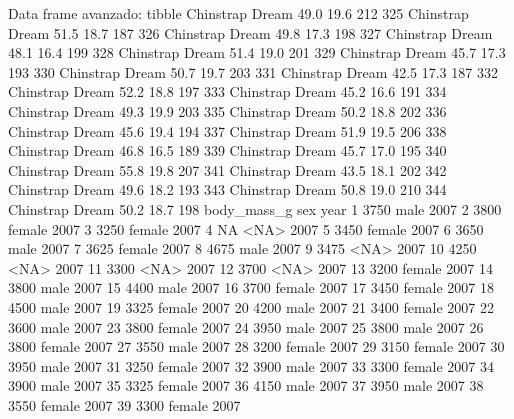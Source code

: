 \documentclass[
  ignorenonframetext,
  aspectratio=169]{beamer}
\let\oldverbatim\verbatim
\let\endoldverbatim\endverbatim
\renewenvironment{verbatim}{\tiny\oldverbatim}{\endoldverbatim}
\begin{document}
\begin{frame}[fragile]{Data frame avanzado: tibble}
\begin{verbatim}
324 Chinstrap     Dream           49.0          19.6               212
325 Chinstrap     Dream           51.5          18.7               187
326 Chinstrap     Dream           49.8          17.3               198
327 Chinstrap     Dream           48.1          16.4               199
328 Chinstrap     Dream           51.4          19.0               201
329 Chinstrap     Dream           45.7          17.3               193
330 Chinstrap     Dream           50.7          19.7               203
331 Chinstrap     Dream           42.5          17.3               187
332 Chinstrap     Dream           52.2          18.8               197
333 Chinstrap     Dream           45.2          16.6               191
334 Chinstrap     Dream           49.3          19.9               203
335 Chinstrap     Dream           50.2          18.8               202
336 Chinstrap     Dream           45.6          19.4               194
337 Chinstrap     Dream           51.9          19.5               206
338 Chinstrap     Dream           46.8          16.5               189
339 Chinstrap     Dream           45.7          17.0               195
340 Chinstrap     Dream           55.8          19.8               207
341 Chinstrap     Dream           43.5          18.1               202
342 Chinstrap     Dream           49.6          18.2               193
343 Chinstrap     Dream           50.8          19.0               210
344 Chinstrap     Dream           50.2          18.7               198
    body_mass_g    sex year
1          3750   male 2007
2          3800 female 2007
3          3250 female 2007
4            NA   <NA> 2007
5          3450 female 2007
6          3650   male 2007
7          3625 female 2007
8          4675   male 2007
9          3475   <NA> 2007
10         4250   <NA> 2007
11         3300   <NA> 2007
12         3700   <NA> 2007
13         3200 female 2007
14         3800   male 2007
15         4400   male 2007
16         3700 female 2007
17         3450 female 2007
18         4500   male 2007
19         3325 female 2007
20         4200   male 2007
21         3400 female 2007
22         3600   male 2007
23         3800 female 2007
24         3950   male 2007
25         3800   male 2007
26         3800 female 2007
27         3550   male 2007
28         3200 female 2007
29         3150 female 2007
30         3950   male 2007
31         3250 female 2007
32         3900   male 2007
33         3300 female 2007
34         3900   male 2007
35         3325 female 2007
36         4150   male 2007
37         3950   male 2007
38         3550 female 2007
39         3300 female 2007

\end{verbatim}
\end{frame}
\end{document}
